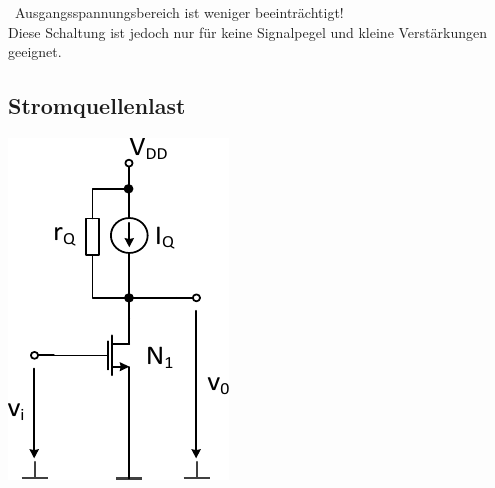 \textrightarrow\ Ausgangsspannungsbereich ist weniger beeinträchtigt! \\
Diese Schaltung ist jedoch nur für keine Signalpegel und kleine Verstärkungen geeignet.


\subsection{Stromquellenlast}

\begin{minipage}[t]{0.23\columnwidth}
    \includegraphics[width=\columnwidth, align=t]{images/07_verstaerker_mit_stromquellenlast.pdf}
\end{minipage}
\hfill
